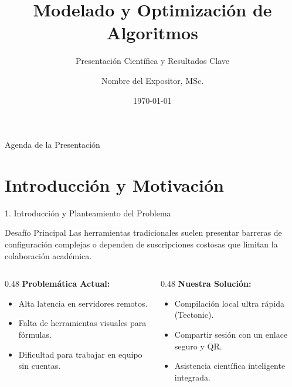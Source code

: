 \documentclass[aspectratio=169, 11pt]{beamer}
\title[\textbf{NaTex Presentation}]{\Huge Modelado y Optimización de Algoritmos}
\subtitle{\Large Presentación Científica y Resultados Clave}
\author[A. Investigador]{Nombre del Expositor, MSc.}
\institute[Universidad]{Facultad de Ciencias de la Computación e Ingeniería\\ Universidad Nacional}
\date[\today]{\today}
\begin{document}
\begin{frame}[plain]
  \titlepage
\end{frame}

\begin{frame}{Agenda de la Presentación}
  \tableofcontents
\end{frame}

\section{Introducción y Motivación}
\begin{frame}{1. Introducción y Planteamiento del Problema}
  \begin{block}{Desafío Principal}
    Las herramientas tradicionales suelen presentar barreras de configuración complejas o dependen de suscripciones costosas que limitan la colaboración académica.
  \end{block}

  \vspace{0.4cm}
  \begin{columns}[T]
    \begin{column}{0.48\textwidth}
      \textbf{Problemática Actual:}
      \begin{itemize}
        \item Alta latencia en servidores remotos.
        \item Falta de herramientas visuales para fórmulas.
        \item Dificultad para trabajar en equipo sin cuentas.
      \end{itemize}
    \end{column}
    \begin{column}{0.48\textwidth}
      \textbf{Nuestra Solución:}
      \begin{itemize}
        \item Compilación local ultra rápida (Tectonic).
        \item Compartir sesión con un enlace seguro y QR.
        \item Asistencia científica inteligente integrada.
      \end{itemize}
    \end{column}
  \end{columns}
\end{frame}

\end{document}
